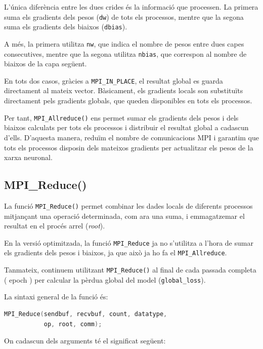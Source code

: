 \documentclass{article}
\begin{document}
L'única diferència entre les dues crides és la informació que processen. La primera suma els gradients dels pesos (\texttt{dw}) de tots els processos, mentre que la segona suma els gradients dels biaixos (\texttt{dbias}).

A més, la primera utilitza \texttt{nw}, que indica el nombre de pesos entre dues capes consecutives, mentre que la segona utilitza \texttt{nbias}, que correspon al nombre de biaixos de la capa següent.

En tots dos casos, gràcies a \texttt{MPI\_IN\_PLACE}, el resultat global es guarda directament al mateix vector. Bàsicament, els gradients locals son substituïts directament pels gradients globals, que queden disponibles en tots els processos.

Per tant, \texttt{MPI\_Allreduce()} ens permet sumar els gradients dels pesos i dels biaixos calculats per tots els processos i distribuir el resultat global a cadascun d'ells. D'aquesta manera, reduïm el nombre de comunicacions MPI i garantim que tots els processos disposin dels mateixos gradients per actualitzar els pesos de la xarxa neuronal.

 

\subsection{MPI\_Reduce()}


La funció \texttt{MPI\_Reduce()} permet combinar les dades locals de diferents processos mitjançant una operació determinada, com ara
una suma, i emmagatzemar el resultat en el procés arrel (\textit{root}).

En la versió optimitzada, la funció \texttt{MPI\_Reduce} ja no s'utilitza a l'hora de sumar els gradients dels pesos i biaixos, ja que això ja ho fa el \texttt{MPI\_Allreduce}.

Tanmateix, continuem utilitzant
\texttt{MPI\_Reduce()} al final de cada passada completa ( epoch ) per calcular la pèrdua global del model
(\texttt{global\_loss}).

\medskip

La sintaxi general de la funció és:

\begin{lstlisting}[language=C]
MPI_Reduce(sendbuf, recvbuf, count, datatype,
           op, root, comm);
\end{lstlisting}


\noindent On cadascun dels arguments té el significat següent:
\end{document}
